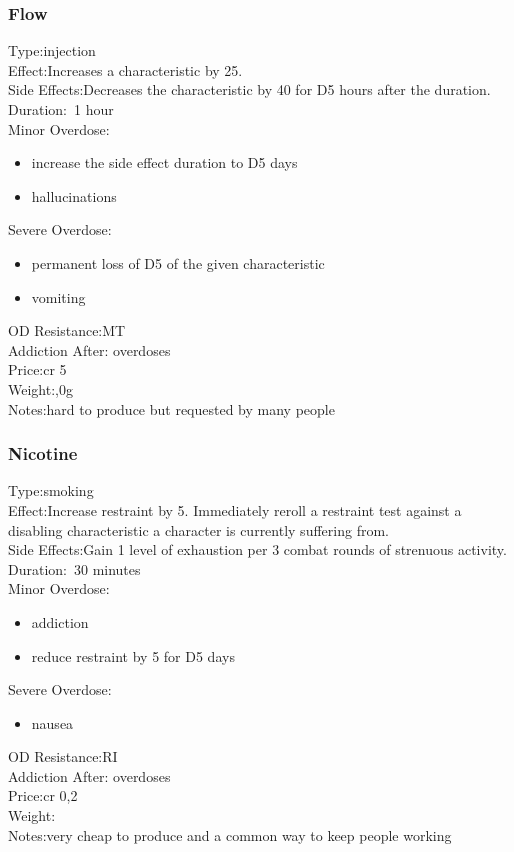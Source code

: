 \subsubsection{Flow}
Type:\tab injection\\
Effect:\tab Increases a characteristic by 25.\\
Side Effects:\tab Decreases the characteristic by 40 for D5 hours after the duration.\\
Duration:\tab ~1 hour\\
Minor Overdose:\\
\begin{itemize}
	\setlength\itemsep{-8mm}
	\vspace{-12mm}
	\item increase the side effect duration to D5 days
	\item hallucinations
\end{itemize}
Severe Overdose:\\
\begin{itemize}
	\setlength\itemsep{-8mm}
	\vspace{-12mm}
	\item permanent loss of D5 of the given characteristic
	\item vomiting
\end{itemize}
OD Resistance:\tab MT\\
Addiction After: overdoses\\
Price:\tab cr 5\\
Weight:,0g\\
Notes:\tab hard to produce but requested by many people


\subsubsection{Nicotine}
Type:\tab smoking\\
Effect:\tab Increase restraint by 5. Immediately reroll a restraint test against a disabling characteristic a character is currently suffering from.\\
Side Effects:\tab Gain 1 level of exhaustion per 3 combat rounds of strenuous activity.\\
Duration:\tab ~30 minutes\\
Minor Overdose:\\
\begin{itemize}
	\setlength\itemsep{-8mm}
	\vspace{-12mm}
	\item addiction
	\item reduce restraint by 5 for D5 days
\end{itemize}
Severe Overdose:\\
\begin{itemize}
	\setlength\itemsep{-8mm}
	\vspace{-12mm}
	\item nausea
\end{itemize}
OD Resistance:\tab RI\\
Addiction After: overdoses\\
Price:\tab cr 0,2\\
Weight:\tab \\
Notes:\tab very cheap to produce and a common way to keep people working


